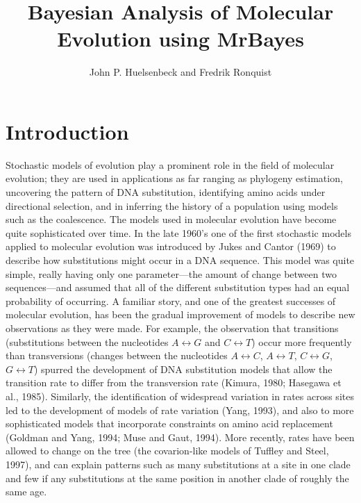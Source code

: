 \documentclass{svmult}
\begin{document}
\nocite{*}

\title*{Bayesian Analysis of Molecular Evolution using {MrBayes}}

\author{John P. Huelsenbeck and Fredrik Ronquist}


\maketitle

\section{Introduction}
\label{intro.sec}

Stochastic models of evolution play a prominent role in the field of molecular evolution; they are
used in applications as far ranging as phylogeny estimation, uncovering the pattern of DNA
substitution, identifying amino acids under directional selection, and in inferring the history of
a population using models such as the coalescence. The models used in molecular evolution have
become quite sophisticated over time. In the late 1960's one of the first stochastic models applied
to molecular evolution was introduced by Jukes and Cantor (1969) to describe how substitutions
might occur in a DNA sequence. This model was quite simple, really having only one parameter---the
amount of change between two sequences---and assumed that all of the different substitution types
had an equal probability of occurring. A familiar story, and one of the greatest successes of
molecular evolution, has been the gradual improvement of models to describe new observations as
they were made. For example, the observation that transitions (substitutions between the
nucleotides $A \leftrightarrow G$ and $C \leftrightarrow T$) occur more frequently than
transversions (changes between the nucleotides $A \leftrightarrow C$, $A \leftrightarrow T$, $C
\leftrightarrow G$, $G \leftrightarrow T$) spurred the development of DNA substitution models that
allow the transition rate to differ from the transversion rate (Kimura, 1980; Hasegawa et al.,
1985). Similarly, the identification of widespread variation in rates across sites led to the
development of  models of rate variation (Yang, 1993), and also to more sophisticated models that
incorporate constraints on amino acid replacement (Goldman and Yang, 1994; Muse and Gaut, 1994).
More recently, rates have been allowed to change on the tree (the covarion-like models of Tuffley
and Steel, 1997), and can explain patterns such as many substitutions at a site in one clade and
few if any substitutions at the same position in another clade of roughly the same age.
\end{document}
